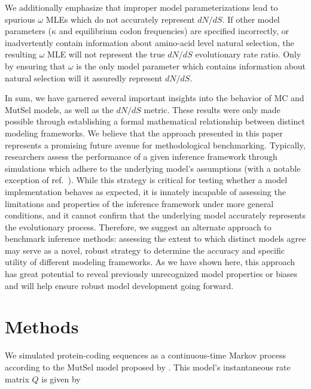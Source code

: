 \documentclass{pnastwo}
\begin{document}
\begin{article}
We additionally emphasize that improper model parameterizations lead to spurious $\omega$ MLEs which do not accurately represent $dN/dS$. If other model parameters ($\kappa$ and equilibrium codon frequencies) are specified incorrectly, or inadvertently contain information about amino-acid level natural selection, the resulting $\omega$ MLE will not represent the true $dN/dS$ evolutionary rate ratio. Only by ensuring that $\omega$ is the only model parameter which contains information about natural selection will it assuredly represent $dN/dS$. 
		
In sum, we have garnered several important insights into the behavior of MC and MutSel models, as well as the $dN/dS$ metric. These results were only made possible through establishing a formal mathematical relationship between distinct modeling frameworks. We believe that the approach presented in this paper represents a promising future avenue for methodological benchmarking. Typically, researchers assess the performance of a given inference framework through simulations which adhere to the underlying model's assumptions (with a notable exception of ref.\ \cite{Holder2008}). While this strategy is critical for testing whether a model implementation behaves as expected, it is innately incapable of assessing the limitations and properties of the inference framework under more general conditions, and it cannot confirm that the underlying model accurately represents the evolutionary process. Therefore, we suggest an alternate approach to benchmark inference methods: assessing the extent to which distinct models agree may serve as a novel, robust strategy to determine the accuracy and specific utility of different modeling frameworks. As we have shown here, this approach has great potential to reveal previously unrecognized model properties or biases and will help ensure robust model development going forward.
		
		
		\section*{Methods}
		
		We simulated protein-coding sequences as a continuous-time Markov process \cite{Yang2006} according to the MutSel model proposed by \cite{HalpernBruno1998}. This model's instantaneous rate matrix $Q$ is given by 
		

\end{article}
\end{document}
